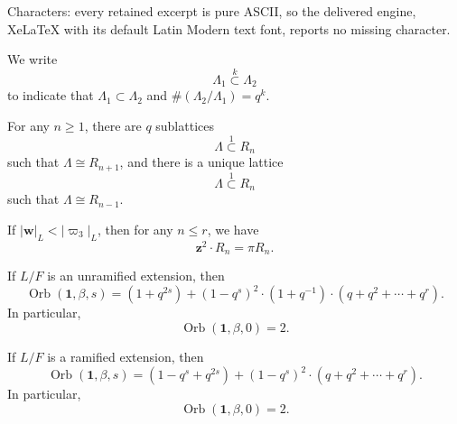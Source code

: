 \documentclass[10pt,a4paper]{amsart}
\newcommand{\Orb}{\operatorname{Orb}}
\newcommand{\mb}[1]{\mathbf{#1}}
\begin{document}
Characters: every retained excerpt is pure ASCII, so the delivered engine, XeLaTeX with its default Latin Modern text font, reports no missing character.
\begin{defn}\label{index}
We write
$$
\Lambda_1 \overset{k}{\subset} \Lambda_2
$$
to indicate that $\Lambda_1 \subset \Lambda_2$ and $\#(\Lambda_2 / \Lambda_1) = q^k$.
\end{defn}

\begin{prop}\label{orbits}
For any $n \geq 1$, there are $q$ sublattices
$$
\Lambda \overset{1}{\subset} R_n
$$
such that $\Lambda \cong R_{n+1}$, and there is a unique lattice
$$
\Lambda \overset{1}{\subset} R_n
$$
such that $\Lambda \cong R_{n-1}$.
\end{prop}

\begin{lem}\label{pilemma}
If $|\mb w|_L < |\varpi_3|_L$, then for any $n \leq r$, we have
$$
\mb z^2 \cdot R_n = \pi R_n.
$$
\end{lem}

\begin{thm}\label{orbitalh=2}
If $L/F$ is an unramified extension, then
$$
\Orb(\mathbf{1}, \beta, s) = (1 + q^{2s}) + (1 - q^s)^2 \cdot (1 + q^{-1}) \cdot (q + q^2 + \cdots + q^r).
$$
In particular,
\begin{equation}\label{unramifiedcen}
\Orb(\mathbf{1}, \beta, 0) = 2.
\end{equation}

If $L/F$ is a ramified extension, then
$$
\Orb(\mathbf{1}, \beta, s) = (1 - q^s + q^{2s}) + (1 - q^s)^2 \cdot (q + q^2 + \cdots + q^r).
$$
In particular,
\begin{equation}\label{ramifiedcen}
\Orb(\mathbf{1}, \beta, 0) = 2.
\end{equation}
\end{thm}
\end{document}
